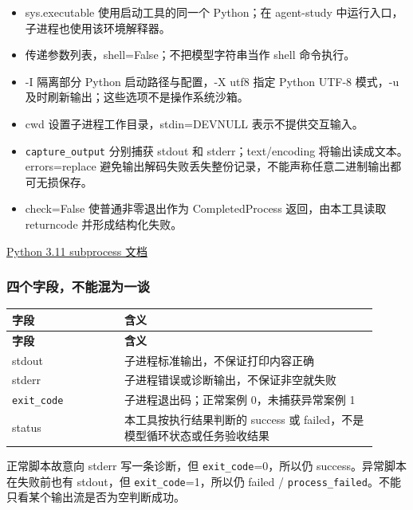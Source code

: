 \begin{itemize}
\item sys.executable 使用启动工具的同一个 Python；在 agent-study 中运行入口，子进程也使用该环境解释器。
\item 传递参数列表，shell=False；不把模型字符串当作 shell 命令执行。
\item -I 隔离部分 Python 启动路径与配置，-X utf8 指定 Python UTF-8 模式，-u 及时刷新输出；这些选项不是操作系统沙箱。
\item cwd 设置子进程工作目录，stdin=DEVNULL 表示不提供交互输入。
\item \nolinkurl{capture_output} 分别捕获 stdout 和 stderr；text/encoding 将输出读成文本。errors=replace 避免输出解码失败丢失整份记录，不能声称任意二进制输出都可无损保存。
\item check=False 使普通非零退出作为 CompletedProcess 返回，由本工具读取 returncode 并形成结构化失败。
\end{itemize}

\href{https://docs.python.org/3.11/library/subprocess.html}{Python 3.11 subprocess 文档}

\subsubsection{四个字段，不能混为一谈}

{\small\setlength{\tabcolsep}{4pt}
\renewcommand{\arraystretch}{1.25}
\begin{longtable}{>{\raggedright\arraybackslash}p{0.28\linewidth}>{\raggedright\arraybackslash}p{0.63\linewidth}}
\toprule
\textbf{字段} & \textbf{含义} \\
\midrule\endfirsthead
\toprule
\textbf{字段} & \textbf{含义} \\
\midrule\endhead
\bottomrule\endfoot
stdout & 子进程标准输出，不保证打印内容正确 \\
stderr & 子进程错误或诊断输出，不保证非空就失败 \\
\nolinkurl{exit_code} & 子进程退出码；正常案例 0，未捕获异常案例 1 \\
status & 本工具按执行结果判断的 success 或 failed，不是模型循环状态或任务验收结果 \\
\end{longtable}}

正常脚本故意向 stderr 写一条诊断，但 \nolinkurl{exit_code}=0，所以仍 success。异常脚本在失败前也有 stdout，但 \nolinkurl{exit_code}=1，所以仍 failed / \nolinkurl{process_failed}。不能只看某个输出流是否为空判断成功。

